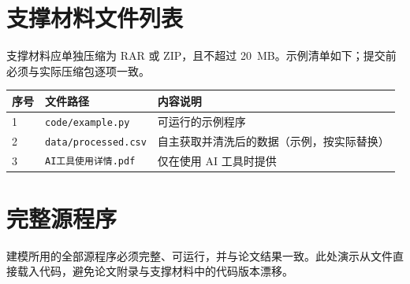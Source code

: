 \documentclass[zihao=-4,a4paper,UTF8,fontset=none]{ctexart}
\begin{document}
\section{支撑材料文件列表}
支撑材料应单独压缩为 RAR 或 ZIP，且不超过 \SI{20}{MB}。示例清单如下；提交前必须与实际压缩包逐项一致。
\begin{longtable}{@{}p{}p{}p{}@{}}
  \toprule
  序号 & 文件路径 & 内容说明 \\
  \midrule
  1 & \texttt{code/example.py} & 可运行的示例程序 \\
  2 & \texttt{data/processed.csv} & 自主获取并清洗后的数据（示例，按实际替换） \\
  3 & \texttt{AI工具使用详情.pdf} & 仅在使用 AI 工具时提供 \\
  \bottomrule
\end{longtable}

\section{完整源程序}
建模所用的全部源程序必须完整、可运行，并与论文结果一致。此处演示从文件直接载入代码，避免论文附录与支撑材料中的代码版本漂移。

\end{document}
